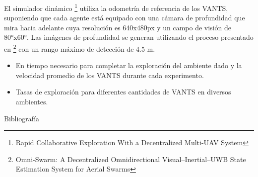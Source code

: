 \documentclass[
  24pt, %
  aspectratio=169, %
]{beamer}
\begin{document}
\begin{frame}
  El simulador dinámico \cite{RACER2022} \footnote{Rapid Collaborative Exploration With a Decentralized Multi-UAV System} utiliza la odometría de referencia de los VANTS, suponiendo que cada agente está equipado con una cámara de profundidad que mira hacia adelante cuya resolución es 640x480px y un campo de visión de 80°x60°. Las imágenes de profundidad se generan utilizando el proceso presentado en \cite{OMNI2022} \footnote{Omni-Swarm: A Decentralized Omnidirectional Visual–Inertial–UWB State Estimation System for Aerial Swarms} con un rango máximo de detección de 4.5 m.
  \bigskip %
  \begin{itemize}
  \item En tiempo necesario para completar la exploración del ambiente dado y la velocidad promedio de los VANTS durante cada experimento.
  \item Tasas de exploración para diferentes cantidades de VANTS en diversos ambientes.
  \end{itemize}
\end{frame}

\begin{frame}{Bibliografía}
  \tiny
  
  
\end{frame}
\end{document}
